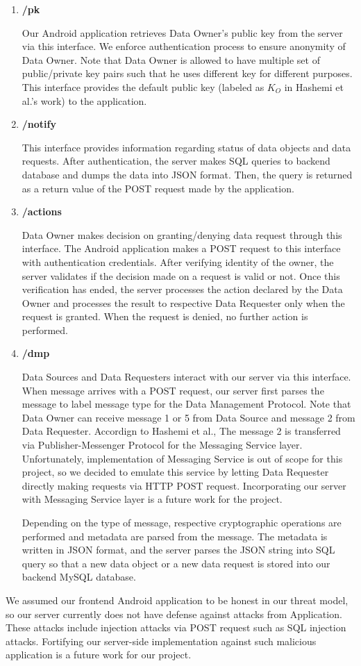 \begin{enumerate}
    \item \textbf{/pk}

    Our Android application retrieves Data Owner's public key from the server via this interface. We enforce authentication process to ensure anonymity of Data Owner. Note that Data Owner is allowed to have multiple set of public/private key pairs such that he uses different key for different purposes. This interface provides the default public key (labeled as $K_O$ in Hashemi et al.'s work) to the application.

    \item \textbf{/notify}

    This interface provides information regarding status of data objects and data requests. After authentication, the server makes SQL queries to backend database and dumps the data into JSON format. Then, the query is returned as a return value of the POST request made by the application.

    \item \textbf{/actions}

    Data Owner makes decision on granting/denying data request through this interface. The Android application makes a POST request to this interface with authentication credentials. After verifying identity of the owner, the server validates if the decision made on a request is valid or not. Once this verification has ended, the server processes the action declared by the Data Owner and processes the result to respective Data Requester only when the request is granted. When the request is denied, no further action is performed.

    \item \textbf{/dmp}

    Data Sources and Data Requesters interact with our server via this interface. When message arrives with a POST request, our server first parses the message to label message type for the Data Management Protocol. Note that Data Owner can receive message 1 or 5 from Data Source and message 2 from Data Requester. Accordign to Hashemi et al., The message 2 is transferred via Publisher-Messenger Protocol for the Messaging Service layer. Unfortunately, implementation of Messaging Service is out of scope for this project, so we decided to emulate this service by letting Data Requester directly making requests via HTTP POST request. Incorporating our server with Messaging Service layer is a future work for the project.

    Depending on the type of message, respective cryptographic operations are performed and metadata are parsed from the message. The metadata is written in JSON format, and the server parses the JSON string into SQL query so that a new data object or a new data request is stored into our backend MySQL database.
\end{enumerate}

We assumed our frontend Android application to be honest in our threat model, so our server currently does not have defense against attacks from Application. These attacks include injection attacks via POST request such as SQL injection attacks. Fortifying our server-side implementation against such malicious application is a future work for our project.